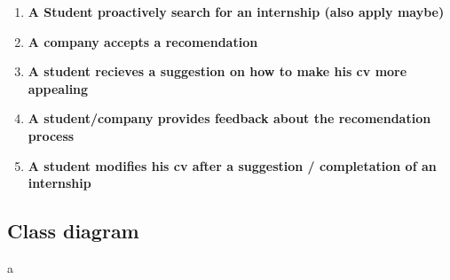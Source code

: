 \begin{enumerate}
     \item \textbf{A Student proactively search for an internship (also apply maybe)}

      \item \textbf{A company accepts a recomendation}

     \item \textbf{A student recieves a suggestion on how to make his cv more appealing}

     \item \textbf{A student/company provides feedback about the recomendation process}

     \item \textbf{A student modifies his cv after a suggestion / completation of an internship}
      
\end{enumerate}


\subsection{Class diagram}
a

